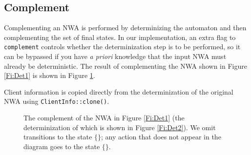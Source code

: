 


\subsection{Complement}
\label{Se:Complement}

Complementing an NWA is performed by determinizing the automaton and then
complementing the set of final states. In our implementation, an extra flag
to \texttt{complement} controls whether the determinization step is to be
performed, so it can be bypassed if you have \textsl{a priori} knowledge that
the input NWA must already be deterministic. The result of
complementing the NWA shown in Figure \ref{Fi:Det1} is
shown in Figure \ref{Fi:Comp1}.

Client information is copied directly
from the determinization of the original NWA using \texttt{ClientInfo::clone()}.

\begin{figure}[h]
  \centering
  \caption{The complement of the NWA in Figure \ref{Fi:Det1} (the
    determinization of which is shown in Figure \ref{Fi:Det2}).  We omit
    transitions to the state $\{\}$; any action that does not appear in the
    diagram goes to the state $\{\}$.
  }
  \label{Fi:Comp1}
\end{figure}



